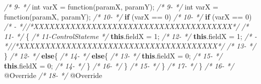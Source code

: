 \documentclass[
]{article}
\newenvironment{Shaded}{\begin{snugshade}}{\end{snugshade}}
\newcommand{\AttributeTok}[1]{\textcolor[rgb]{0.77,0.63,0.00}{#1}}
\newcommand{\CommentTok}[1]{\textcolor[rgb]{0.56,0.35,0.01}{\textit{#1}}}
\newcommand{\DataTypeTok}[1]{\textcolor[rgb]{0.13,0.29,0.53}{#1}}
\newcommand{\DecValTok}[1]{\textcolor[rgb]{0.00,0.00,0.81}{#1}}
\newcommand{\FunctionTok}[1]{\textcolor[rgb]{0.00,0.00,0.00}{#1}}
\newcommand{\KeywordTok}[1]{\textcolor[rgb]{0.13,0.29,0.53}{\textbf{#1}}}
\newcommand{\NormalTok}[1]{#1}
\begin{document}
\begin{landscape}
\begin{Shaded}
\begin{Highlighting}[]
\CommentTok{/*  9-                 */}        \DataTypeTok{int}\NormalTok{ varX = }\FunctionTok{function}\NormalTok{(paramX, paramY);                   }\CommentTok{/*  9-                 */}        \DataTypeTok{int}\NormalTok{ varX = }\FunctionTok{function}\NormalTok{(paramX, paramY);                           }
\CommentTok{/* 10-                 */}        \KeywordTok{if}\NormalTok{ (varX == }\DecValTok{0}\NormalTok{)                                         }\CommentTok{/* 10-                 */}        \KeywordTok{if}\NormalTok{ (varX == }\DecValTok{0}\NormalTok{)                                         }
\CommentTok{/*   -                 *//*XXXXXXXXXXXXXXXXXXXXXXXXXXXXXXXXXXXXXX*/}                     \CommentTok{/* 11-                 */}\NormalTok{        \{                                                      }
\CommentTok{/* 11-ControlStateme   */}            \KeywordTok{this}\NormalTok{.}\FunctionTok{fieldX}\NormalTok{ = }\DecValTok{1}\NormalTok{;                                   }\CommentTok{/* 12-                 */}            \KeywordTok{this}\NormalTok{.}\FunctionTok{fieldX}\NormalTok{ = }\DecValTok{1}\NormalTok{;                                   }
\CommentTok{/*   -                 *//*XXXXXXXXXXXXXXXXXXXXXXXXXXXXXXXXXXXXXX*/}                     \CommentTok{/* 13-                 */}\NormalTok{        \}                                                                }
\CommentTok{/* 12-                 */}        \KeywordTok{else}\NormalTok{\{                                                  }\CommentTok{/* 14-                 */}        \KeywordTok{else}\NormalTok{\{                                                  }
\CommentTok{/* 13-                 */}            \KeywordTok{this}\NormalTok{.}\FunctionTok{fieldX}\NormalTok{ = }\DecValTok{0}\NormalTok{;                                   }\CommentTok{/* 15-                 */}            \KeywordTok{this}\NormalTok{.}\FunctionTok{fieldX}\NormalTok{ = }\DecValTok{0}\NormalTok{;                                   }
\CommentTok{/* 14-                 */}\NormalTok{       \}                                                       }\CommentTok{/* 16-                 */}\NormalTok{        \}                                                              }
\CommentTok{/* 15-                 */}\NormalTok{    \}                                                          }\CommentTok{/* 17-                 */}\NormalTok{    \}                                           }
\CommentTok{/* 16-                 */}    \AttributeTok{@Override}                                                  \CommentTok{/* 18-                 */}    \AttributeTok{@Override}                                                  

\end{Highlighting}
\end{Shaded}
\end{landscape}
\end{document}
